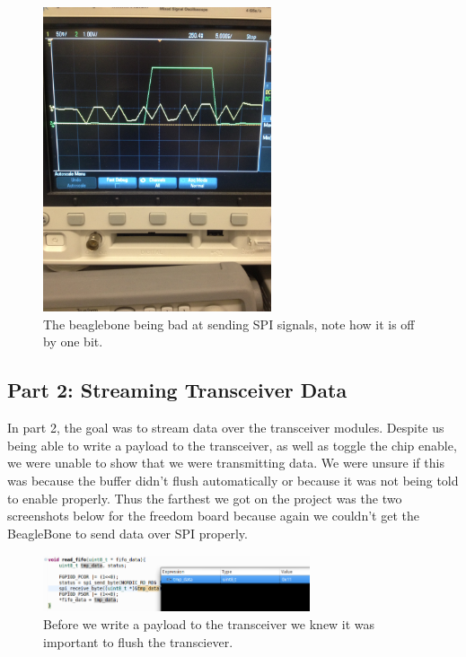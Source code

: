 \documentclass{article}
\begin{document}
\begin{figure}[H]
    \centering
    \includegraphics[width=0.6\textwidth,angle=-90]{BEAGLE_FAIL.jpg}
    \caption{The beaglebone being bad at sending SPI signals, note how it is off by one bit.}
\end{figure}

\subsection*{Part 2: Streaming Transceiver Data}
In part 2, the goal was to stream data over the transceiver modules. Despite us being able to write a payload to the transceiver, as well as toggle the chip enable, we were unable to show that we were transmitting data. We were unsure if this was because the buffer didn't flush automatically or because it was not being told to enable properly. Thus the farthest we got on the project was the two screenshots below for the freedom board because again we couldn't get the BeagleBone to send data
over SPI properly.

\begin{figure}[H]
    \centering
    \includegraphics[width=0.7\textwidth]{tx_fifo_flush.png}
    \caption{Before we write a payload to the transceiver we knew it was important to flush the transciever.}
\end{figure}
\end{document}
